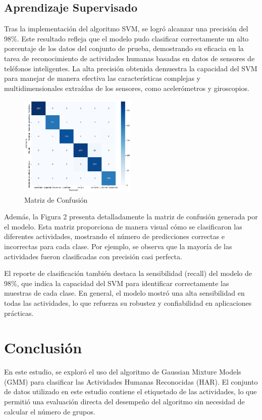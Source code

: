\documentclass{esannV2}
\begin{document}
\subsection{Aprendizaje Supervisado}
Tras la implementación del algoritmo SVM, se logró alcanzar una precisión del 98\%. Este resultado refleja que el modelo pudo clasificar correctamente un alto porcentaje de los datos del conjunto de prueba, demostrando su eficacia en la tarea de reconocimiento de actividades humanas basadas en datos de sensores de teléfonos inteligentes. La alta precisión obtenida demuestra la capacidad del SVM para manejar de manera efectiva las características complejas y multidimensionales extraídas de los sensores, como acelerómetros y giroscopios.
\begin{figure}[ht!]
\centering
\includegraphics[width=0.5\textwidth]{figs/SVM_matriz.png}
\caption{Matriz de Confusión}\label{Fig:matriz_SVG}
\end{figure}
Además, la Figura 2 presenta detalladamente la matriz de confusión generada por el modelo. Esta matriz proporciona de manera visual cómo se clasificaron las diferentes actividades, mostrando el número de predicciones correctas e incorrectas para cada clase. Por ejemplo, se observa que la mayoría de las actividades fueron clasificadas con precisión casi perfecta.

El reporte de clasificación también destaca la sensibilidad (recall) del modelo de 98\%, que indica la capacidad del SVM para identificar correctamente las muestras de cada clase. En general, el modelo mostró una alta sensibilidad en todas las actividades, lo que refuerza su robustez y confiabilidad en aplicaciones prácticas.


\section{Conclusión}
En este estudio, se exploró el uso del algoritmo de Gaussian Mixture Models (GMM) para clasificar las Actividades Humanas Reconocidas (HAR). El conjunto de datos utilizado en este estudio contiene el etiquetado de las actividades, lo que permitió una evaluación directa del desempeño del algoritmo sin necesidad de calcular el número de grupos.
\end{document}
